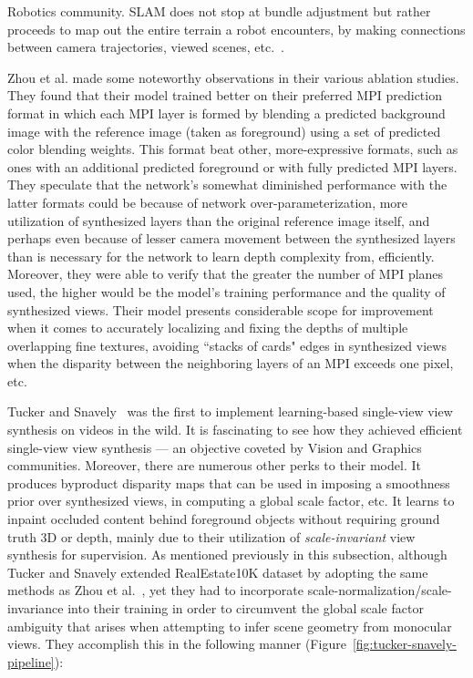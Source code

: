 Robotics community. SLAM does not stop at bundle adjustment but rather proceeds to map out the entire terrain a robot encounters, by making connections between camera trajectories, viewed scenes, etc.~\cite{noauthor_what_nodate}. 

Zhou et al. made some noteworthy observations in their various ablation studies. They found that their model trained better on their preferred MPI prediction format in which each MPI layer is formed by blending a predicted background image with the reference image (taken as foreground) using a set of predicted color blending weights. This format beat other, more-expressive formats, such as ones with an additional predicted foreground or with fully predicted MPI layers. They speculate that the network's somewhat diminished performance with the latter formats could be because of network over-parameterization, more utilization of synthesized layers than the original reference image itself, and perhaps even because of lesser camera movement between the synthesized layers than is necessary for the network to learn depth complexity from, efficiently. Moreover, they were able to verify that the greater the number of MPI planes used, the higher would be the model's training performance and the quality of synthesized views. Their model presents considerable scope for improvement when it comes to accurately localizing and fixing the depths of multiple overlapping fine textures, avoiding ``stacks of cards" edges in synthesized views when the disparity between the neighboring layers of an MPI exceeds one pixel, etc.

Tucker and Snavely~\cite{single_view_mpi} was the first to implement learning-based single-view view synthesis on videos in the wild. It is fascinating to see how they achieved efficient single-view view synthesis --- an objective coveted by Vision and Graphics communities. Moreover, there are numerous other perks to their model. It produces byproduct disparity maps that can be used in imposing a smoothness prior over synthesized views, in computing a global scale factor, etc. It learns to inpaint occluded content behind foreground objects without requiring ground truth 3D or depth, mainly due to their utilization of \textit{scale-invariant} view synthesis for supervision. As mentioned previously in this subsection, although Tucker and Snavely extended RealEstate10K dataset by adopting the same methods as Zhou et al.~\cite{zhou2018stereo}, yet they had to incorporate scale-normalization/scale-invariance into their training in order to circumvent the global scale factor ambiguity that arises when attempting to infer scene geometry from monocular views. They accomplish this in the following manner (Figure~\ref{fig:tucker-snavely-pipeline}):

